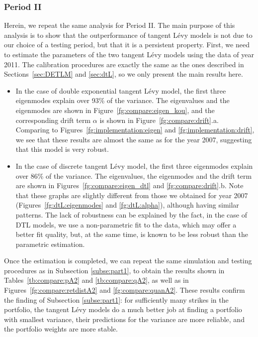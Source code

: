 \documentclass{article}
\numberwithin{equation}{section}
\begin{document}
\subsubsection{Period II}
\label{subse:period2}


Herein, we repeat the same analysis for Period II. The main purpose of this analysis is to show that the outperformance of tangent L\'evy models is not due to our choice of a testing period, but that it is a persistent property. First, we need to estimate the parameters of the two tangent L\'{e}vy models using the data of year 2011. The calibration procedures are exactly the same as the ones described in Sections~\ref{sec:DETLM} and \ref{sec:dtL}, so we only present the main results here.

\begin{itemize}
\item In the case of double exponential tangent L\'{e}vy model, the first three eigenmodes explain over 93\% of the variance. The eigenvalues and the eigenmodes are shown in Figure~\ref{fg:compare:eigen_kou}, and the corresponding drift term $\alpha$ is shown in Figure~\ref{fg:compare:drift}.a. Comparing to Figures~\ref{fg:implementation:eigen} and \ref{fg:implementation:drift}, we see that these results are almost the same as for the year 2007, suggesting that this model is very robust. 

\item In the case of discrete tangent L\'{e}vy model, the first three eigenmodes explain over 86\%  of the variance. The eigenvalues, the eigenmodes and the drift term are shown in Figures~\ref{fg:compare:eigen_dtl} and \ref{fg:compare:drift}.b. Note that these graphs are slightly different from those we obtained for year 2007 (Figures~\ref{fg:dtL:eigenmodes} and \ref{fg:dtL:alpha}), although having similar patterns. The lack of robustness can be explained by the fact, in the case of DTL models, we use a non-parametric fit to the data, which may offer a better fit quality, but, at the same time, is known to be less robust than the parametric estimation. 
\end{itemize}


Once the estimation is completed, we can repeat the same simulation and testing procedures as in Subsection \ref{subse:part1}, to obtain the results shown in Tables~\ref{tb:compare:pA2} and \ref{tb:compare:qA2}, as well as in Figures~\ref{fg:compare:retdistA2} and \ref{fg:compare:quanA2}. These results confirm the finding of Subsection \ref{subse:part1}: for sufficiently many strikes in the portfolio, the tangent L\'{e}vy models do a much better job at finding a portfolio with smallest variance, their predictions for the variance are more reliable, and the portfolio weights are more stable. 
\end{document}
